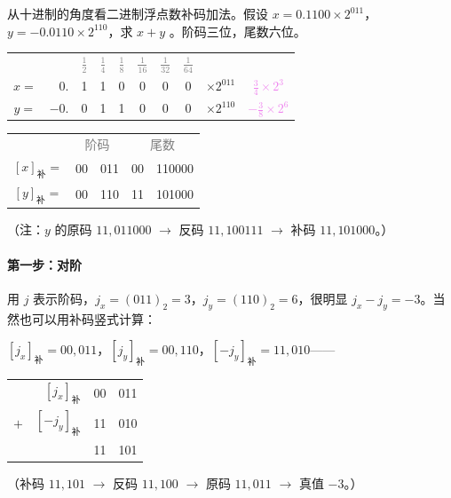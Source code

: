 \documentclass[UTF8]{ctexart}
\newcommand\littleword[1]{\textcolor{gray}{\footnotesize #1}}
\begin{document}
{\color{cyan!50!black}
从十进制的角度看二进制浮点数补码加法。假设 $x=0.1100\times 2^{011}$，$y=-0.0110\times 2^{110}$，求 $x+y$ 。阶码三位，尾数六位。
}

\begin{table}[htb]
  \centering
  \begin{tabular}{crccccccc@{\qquad}c}
  & & \littleword{$\frac12$} &  \littleword{$\frac14$} &  \littleword{$\frac18$} &  \littleword{$\frac{1}{16}$} & \littleword{$\frac{1}{32}$} & \littleword{$\frac{1}{64}$} \\
  $x=$ & $0.$ & 1 & 1 & 0 & 0 & 0 & 0 & $\times 2^{011}$ & \textcolor{violet}{$\frac34\times 2^3$}\\
  $y=$ & $-0.$ & 0 & 1 & 1 & 0 & 0 & 0 & $\times 2^{110}$ & \textcolor{violet}{$-\frac{3}{8}\times 2^6$}\\
  \end{tabular} 
  
  
  \begin{tabular}{cc@{\ ,\ }c@{\quad ;\quad }c@{\ ,\ }c}
    & \multicolumn{2}{c}{\littleword{阶码}} & \multicolumn{2}{c}{\littleword{尾数}} \\
    $[x]_{\text{补}} = $ & 00 & 011 & 00 & 110000 \\
    $[y]_{\text{补}} = $ & 00 & 110 & 11 & 101000 \\
  \end{tabular}
\end{table}

（注：$y$ 的原码 $11,011000$ $\to$ 反码 $11,100111$ $\to$ 补码 $11,101000$。）


\paragraph{第一步：对阶} 
用 $j$ 表示阶码，$j_x = (011)_2 = 3$，$j_y = (110)_2 = 6$，很明显 $j_x-j_y=-3$。当然也可以用补码竖式计算：

$[j_x]_{\text{补}} = 00,011$，$[j_y]_{\text{补}} = 00,110$，$[-j_y]_{\text{补}} = 11,010$——
\begin{table}[htb]
  \centering
  \begin{tabular}{lr@{\quad}c@{\ ,\ }c}
      & $[j_x]_{\text{补}}$ & 00 & 011 \\
  $+$ & $[-j_y]_{\text{补}}$ &11 & 010 \\
  \hline
      & & 11 & 101 \\
  \end{tabular}
\end{table}

（补码 $11,101$ $\to$ 反码 $11,100$ $\to$ 原码 $11,011$ $\to$ 真值 $-3$。）
\end{document}
